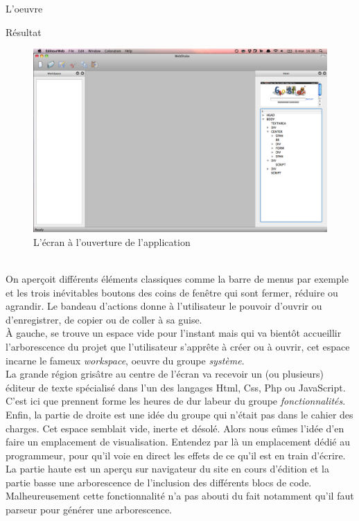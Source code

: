 \documentclass[a4paper, 12pt]{report}
\begin{document}
\begin{part}{L'oeuvre}
\begin{chapter}{Résultat}
			\begin{figure}[h]
				\begin{center}
					\includegraphics[width=15cm]{images/screenOpening.png}
					\caption{L'écran à l'ouverture de l'application}
					\label{mayonnaise}
				\end{center}
			\end{figure}~\\


			On aperçoit différents éléments classiques comme la barre de menus par exemple et les trois inévitables boutons des coins de fenêtre qui sont fermer, réduire ou agrandir. Le bandeau d'actions donne à l'utilisateur le pouvoir d'ouvrir ou d'enregistrer, de copier ou de coller
			à sa guise.\\


			À gauche, se trouve un espace vide pour l'instant mais qui va bientôt accueillir l'arborescence du projet que l'utilisateur
			s'apprête à créer ou à ouvrir, cet espace incarne le fameux \emph{workspace}, oeuvre du groupe \emph{système}.\\


			La grande région grisâtre au centre de l'écran va recevoir un (ou plusieurs) éditeur de texte spécialisé dans l'un des langages
			\gls{Html}, \gls{Css}, \gls{Php} ou \gls{JavaScript}. C'est ici que prennent forme les heures de dur labeur du groupe
			\emph{fonctionnalités}.\\


			Enfin, la partie de droite est une idée du groupe qui n'était pas dans le cahier des charges. Cet espace semblait vide, inerte et désolé.
			Alors nous eûmes l'idée d'en faire un emplacement de visualisation. Entendez par là un emplacement dédié au programmeur, pour qu'il
			voie en direct les effets de ce qu'il est en train d'écrire.\\
			La partie haute est un aperçu sur navigateur du site en cours d'édition et la partie basse une arborescence de l'inclusion des
			différents blocs de code.\\
			Malheureusement cette fonctionnalité n'a pas abouti du fait notamment qu'il faut \gls{parseur} pour générer une arborescence.\\



\end{chapter}
\end{part}
\end{document}
